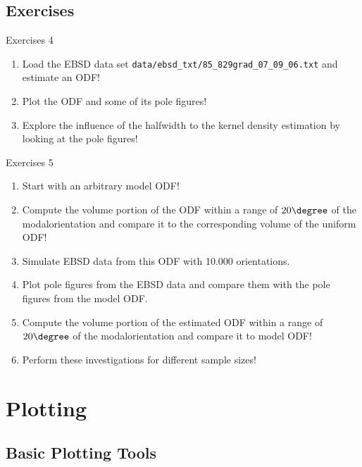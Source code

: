 \documentclass{beamer}
\begin{document}
\subsection*{Exercises}

\begin{frame}
  
  \begin{block}{Exercises 4}
    \begin{enumerate}
    \item Load the EBSD data set
      \texttt{data/ebsd\_txt/85\_829grad\_07\_09\_06.txt} and estimate an ODF!
    \item Plot the ODF and some of its pole figures!
    \item Explore the influence of the halfwidth to the kernel 
      density estimation by looking at the pole figures!
    \end{enumerate}
  \end{block}
  
  \begin{block}{Exercises 5}
    \begin{enumerate}
    \item Start with an arbitrary model ODF!
    \item Compute the volume portion of the ODF within a range of $20\degree$
      of the modalorientation and compare it to the corresponding volume of
      the uniform ODF!
    \item Simulate EBSD data from this ODF with 10.000 orientations.
    \item Plot pole figures from the EBSD data and compare them with the pole
      figures from the model ODF.
    \item Compute the volume portion of the estimated ODF within a range of
      $20\degree$ of the modalorientation and compare it to model ODF!
    \item Perform these investigations for different sample sizes!
    \end{enumerate}
  \end{block}

\end{frame}



\section{Plotting}


\subsection*{Basic Plotting Tools}
\end{document}

